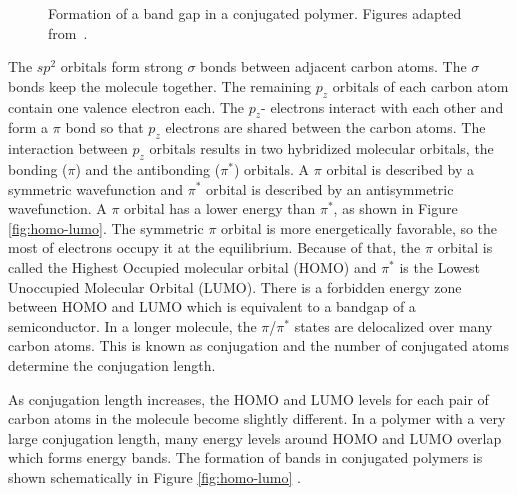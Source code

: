 \begin{figure}[h]
\centering
{} 
{} 
\caption{Formation of a band gap in a conjugated polymer. Figures adapted from~\cite{cambridge}.}
	  \label{fig:conjugation}
\end{figure}

The $sp^2$ orbitals form strong $\sigma$ bonds between adjacent carbon atoms. The $\sigma$ bonds keep the molecule together. The remaining $p_z$ orbitals of each carbon atom contain one valence electron each. The $p_z$- electrons interact with each other and form a $\pi$ bond so that $p_z$ electrons are shared between the carbon atoms. The interaction between $p_z$ orbitals results in two hybridized molecular orbitals, the bonding ($\pi$) and the antibonding ($\pi^*$) orbitals. A $\pi$ orbital is described by a symmetric wavefunction and $\pi^*$ orbital is described by an antisymmetric wavefunction. A $\pi$ orbital has a lower energy than $\pi^*$, as shown in Figure \ref{fig:homo-lumo}. The symmetric $\pi$ orbital is more energetically favorable, so the most of electrons occupy it at the equilibrium. Because of that, the $\pi$ orbital is called the Highest Occupied molecular orbital (HOMO) and $\pi^*$ is the Lowest Unoccupied Molecular Orbital (LUMO). There is a forbidden energy zone between HOMO and LUMO which is equivalent to a bandgap of a semiconductor. In a longer molecule, the $\pi$/$\pi^*$ states are delocalized over many carbon atoms. This is known as conjugation and the number of conjugated atoms determine the conjugation length.\\
\par As conjugation length increases, the HOMO and LUMO levels for each pair of carbon atoms in the molecule become slightly different. In a polymer with a very large conjugation length, many energy levels around HOMO and LUMO overlap which forms energy bands. The formation of bands in conjugated polymers is shown schematically in Figure \ref{fig:homo-lumo} \cite{Koehler_book,cambridge}. \\

